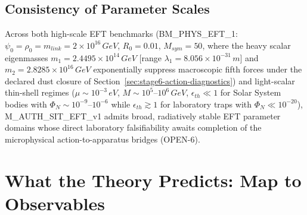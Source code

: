 \documentclass[american,11pt,letterpaper]{article}
\def\mathrm#1{#1}%
\def\texttt#1{#1}%
\begin{document}
\subsection{Consistency of Parameter Scales}

Across both high-scale EFT benchmarks (\texttt{BM\_PHYS\_EFT\_1}: $\psi_0 = \rho_0 = m_{\mathrm{link}} = 2\times 10^{16}\,\mathrm{GeV}$, $R_0 = 0.01$, $M_{\mathrm{sym}} = 50$, where the heavy scalar eigenmasses $m_1 = 2.4495\times 10^{14}\,\mathrm{GeV}$ [range $\lambda_1 = 8.056\times 10^{-31}\,\mathrm{m}$] and $m_2 = 2.8285\times 10^{16}\,\mathrm{GeV}$ exponentially suppress macroscopic fifth forces under the declared dust closure of Section~\ref{sec:stage6-action-diagnostics}) and light-scalar thin-shell regimes ($\mu \sim 10^{-3}\,\mathrm{eV}$, $M \sim 10^5\text{--}10^6\,\mathrm{GeV}$, $\epsilon_{\mathrm{th}} \ll 1$ for Solar System bodies with $\Phi_N \sim 10^{-9}\text{--}10^{-6}$ while $\epsilon_{\mathrm{th}} \gtrsim 1$ for laboratory traps with $\Phi_N \ll 10^{-20}$), \texttt{M\_AUTH\_SIT\_EFT\_v1} admits broad, radiatively stable EFT parameter domains whose direct laboratory falsifiability awaits completion of the microphysical action-to-apparatus bridges (\texttt{OPEN-6}).

\section{What the Theory Predicts: Map to Observables}
\label{sec:map-to-observables}
\end{document}
